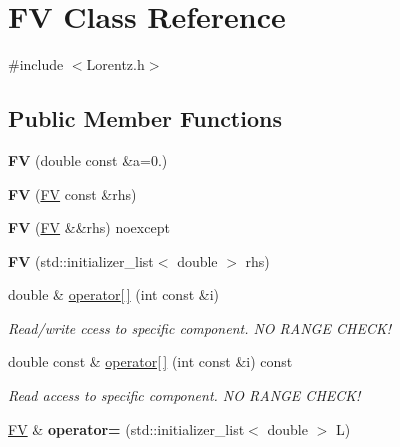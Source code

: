 \hypertarget{classFV}{\section{F\-V Class Reference}
\label{classFV}
}


{\ttfamily \#include $<$Lorentz.\-h$>$}

\subsection*{Public Member Functions}
\begin{DoxyCompactItemize}
\item 
\hypertarget{classFV_a9b4fbb099348e0f5658290d99fcfde0f}{{\bfseries F\-V} (double const \&a=0.)}\label{classFV_a9b4fbb099348e0f5658290d99fcfde0f}

\item 
\hypertarget{classFV_a7806dbe1498cda6e7b5e9deb0772915d}{{\bfseries F\-V} (\hyperlink{classFV}{F\-V} const \&rhs)}\label{classFV_a7806dbe1498cda6e7b5e9deb0772915d}

\item 
\hypertarget{classFV_a64d4ea0c4b74dd2fd557c72c30987aa5}{{\bfseries F\-V} (\hyperlink{classFV}{F\-V} \&\&rhs) noexcept}\label{classFV_a64d4ea0c4b74dd2fd557c72c30987aa5}

\item 
\hypertarget{classFV_aae9c72a65282efeadacc1b2be82b8b29}{{\bfseries F\-V} (std\-::initializer\-\_\-list$<$ double $>$ rhs)}\label{classFV_aae9c72a65282efeadacc1b2be82b8b29}

\item 
\hypertarget{classFV_addb4bbcc8d3ba7d8e94c1b6fdd006acd}{double \& \hyperlink{classFV_addb4bbcc8d3ba7d8e94c1b6fdd006acd}{operator\mbox{[}$\,$\mbox{]}} (int const \&i)}\label{classFV_addb4bbcc8d3ba7d8e94c1b6fdd006acd}

\begin{DoxyCompactList}\small\item\em Read/write ccess to specific component. N\-O R\-A\-N\-G\-E C\-H\-E\-C\-K! \end{DoxyCompactList}\item 
\hypertarget{classFV_a8c340629f03c5f4d96aefd119dd43d6e}{double const \& \hyperlink{classFV_a8c340629f03c5f4d96aefd119dd43d6e}{operator\mbox{[}$\,$\mbox{]}} (int const \&i) const }\label{classFV_a8c340629f03c5f4d96aefd119dd43d6e}

\begin{DoxyCompactList}\small\item\em Read access to specific component. N\-O R\-A\-N\-G\-E C\-H\-E\-C\-K! \end{DoxyCompactList}\item 
\hypertarget{classFV_a3ce0839ccafbead03b532cdf4af5d4c1}{\hyperlink{classFV}{F\-V} \& {\bfseries operator=} (std\-::initializer\-\_\-list$<$ double $>$ L)}\label{classFV_a3ce0839ccafbead03b532cdf4af5d4c1}


\end{DoxyCompactItemize}
